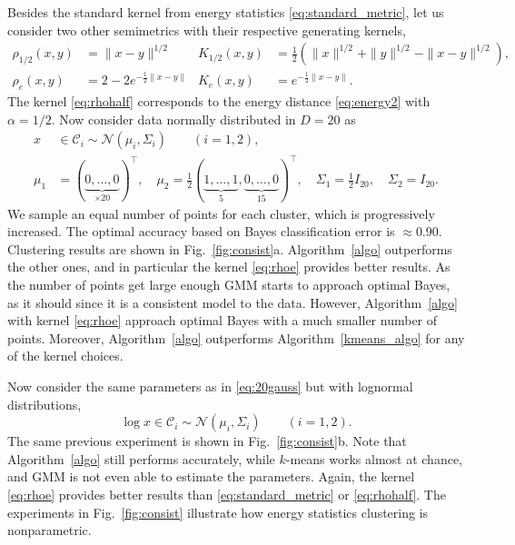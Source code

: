 \documentclass[aps,preprint,nofootinbib,floatfix]{revtex4-1}
\newcommand\kk{K}
\newcommand\C{{\mathcal{C}}}
\begin{document}
Besides the standard kernel from energy statistics 
\eqref{eq:standard_metric}, 
let us consider two other semimetrics with their respective generating
kernels,
\begin{align}
\rho_{1/2}(x,y) &= \| x-y \|^{1/2} & 
 \kk_{1/2}(x,y) &= \tfrac{1}{2} \left( 
\| x \|^{1/2} + \| y \|^{1/2} 
- \| x-y \|^{1/2} \right), \label{eq:rhohalf}\\
\rho_{e}(x,y) &= 
2 - 2 e^{-\tfrac{1}{2}\| x- y\|} &
 \kk_{e}(x,y) &= e^{-\tfrac{1}{2}\| x-y\|}.
\label{eq:rhoe}
\end{align}
The kernel \eqref{eq:rhohalf} corresponds to the energy distance
\eqref{eq:energy2} with $\alpha=1/2$.
Now consider data normally distributed in $D=20$ as
\begin{equation}
\label{eq:20gauss}
\begin{split}
x &\in \C_i \sim \mathcal{N}(\mu_i,\Sigma_i) \qquad (i=1,2), \\
\mu_1 &= (\underbrace{0,\dotsc,0}_{\times 20})^\top ,\quad
\mu_2 = \tfrac{1}{2} 
(\underbrace{1,\dotsc,1}_{5},\underbrace{0,\dotsc,0}_{15})^\top, \quad
\Sigma_1 = \tfrac{1}{2} I_{20},  \quad
\Sigma_2 = I_{20}.
\end{split}
\end{equation}
We sample an equal number of points for each cluster, which is progressively
increased. The optimal accuracy based on Bayes
classification error is $\approx 0.90$. 
Clustering results are shown in Fig.~\ref{fig:consist}a.
Algorithm~\ref{algo} outperforms the other ones, and in 
particular the kernel \eqref{eq:rhoe} provides better results.
As the number of points get large enough GMM starts to approach
optimal Bayes, as it should since it is a
consistent model to the data. However, 
Algorithm~\ref{algo} with kernel \eqref{eq:rhoe} approach optimal Bayes
with a much smaller number of points. Moreover, Algorithm~\ref{algo} 
outperforms
Algorithm~\ref{kmeans_algo} for any of the kernel choices.

Now consider the same parameters as in \eqref{eq:20gauss} but with
lognormal distributions, 
\begin{equation}
\label{eq:20loggauss}
\log x \in \C_i \sim \mathcal{N}(\mu_i, \Sigma_i) \qquad (i=1,2).
\end{equation}
The same previous experiment is shown in 
Fig.~\ref{fig:consist}b.
Note that Algorithm~\ref{algo} still performs accurately, 
while $k$-means works almost at chance,
and GMM is not even able to estimate the parameters. Again, the
kernel \eqref{eq:rhoe}
provides better results than \eqref{eq:standard_metric} or
\eqref{eq:rhohalf}. 
The experiments in Fig.~\ref{fig:consist}
illustrate how energy statistics clustering is nonparametric.
\end{document}
